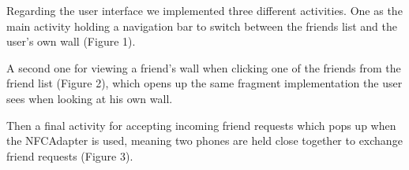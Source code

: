 \documentclass{report}
\begin{document}
Regarding the user interface we implemented three different activities. One as the main activity holding a navigation bar to switch between the friends list and the user's own wall (Figure 1).
\begin{figure}[H]
	\centering
	\hfill
	\hfill
	
\end{figure}

 A second one for viewing a friend's wall when clicking one of the friends from the friend list (Figure 2), which opens up the same fragment implementation the user sees when looking at his own wall.\newline
 

Then a final activity for accepting incoming friend requests which pops up when the NFCAdapter is used, meaning two phones are held close together to exchange friend requests (Figure 3).
\end{document}
